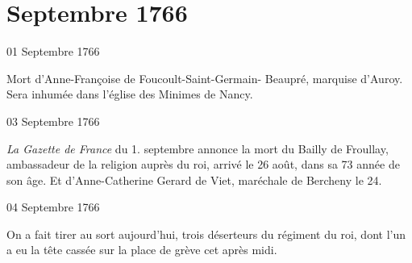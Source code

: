                   \chapter*{Septembre 1766}
                     
                     
                     
                     \begin{diary}{01 Septembre 1766}{}
                        
                         Mort d’Anne-Françoise de Foucoult-Saint-Germain-
                              Beaupré, marquise d’Auroy. Sera inhumée
                           dans l’église des Minimes de
                              Nancy. \bigskip
        
        
                     \end{diary}

                     \begin{diary}{03 Septembre 1766}{}
                        
                        
                           \emph{La Gazette de France} du 1. septembre annonce
                           la mort du Bailly de
                              Froullay, ambassadeur de la
                           religion auprès du roi,
                           arrivé le 26 août, dans
                           sa 73 année de son âge. Et d’Anne-Catherine
                              Gerard de Viet, maréchale de Bercheny
                           le 24. \bigskip
        
        
                     \end{diary}

                     \begin{diary}{04 Septembre 1766}{}
                        
                         On a fait tirer au sort aujourd'hui,
                           trois
                           déserteurs du régiment du roi, dont l’un a eu
                           la tête cassée sur la place de grève cet après
                           midi. \bigskip
        
        
                     \end{diary}

